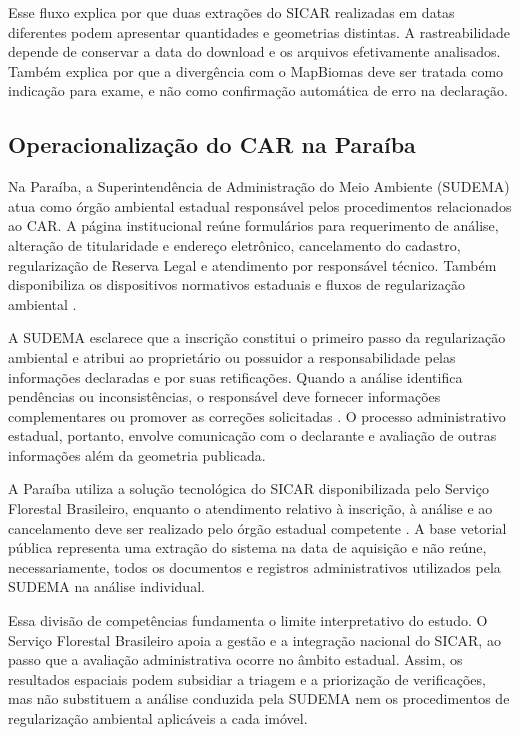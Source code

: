 Esse fluxo explica por que duas extrações do SICAR realizadas em datas diferentes podem apresentar quantidades e geometrias distintas. A rastreabilidade depende de conservar a data do download e os arquivos efetivamente analisados. Também explica por que a divergência com o MapBiomas deve ser tratada como indicação para exame, e não como confirmação automática de erro na declaração.

\subsection{Operacionalização do CAR na Paraíba}

Na Paraíba, a Superintendência de Administração do Meio Ambiente (SUDEMA) atua como órgão ambiental estadual responsável pelos procedimentos relacionados ao CAR. A página institucional reúne formulários para requerimento de análise, alteração de titularidade e endereço eletrônico, cancelamento do cadastro, regularização de Reserva Legal e atendimento por responsável técnico. Também disponibiliza os dispositivos normativos estaduais e fluxos de regularização ambiental \cite{sudema2026}.

A SUDEMA esclarece que a inscrição constitui o primeiro passo da regularização ambiental e atribui ao proprietário ou possuidor a responsabilidade pelas informações declaradas e por suas retificações. Quando a análise identifica pendências ou inconsistências, o responsável deve fornecer informações complementares ou promover as correções solicitadas \cite{sudema2026}. O processo administrativo estadual, portanto, envolve comunicação com o declarante e avaliação de outras informações além da geometria publicada.

A Paraíba utiliza a solução tecnológica do SICAR disponibilizada pelo Serviço Florestal Brasileiro, enquanto o atendimento relativo à inscrição, à análise e ao cancelamento deve ser realizado pelo órgão estadual competente \cite{brasilservicocar2025}. A base vetorial pública representa uma extração do sistema na data de aquisição e não reúne, necessariamente, todos os documentos e registros administrativos utilizados pela SUDEMA na análise individual.

Essa divisão de competências fundamenta o limite interpretativo do estudo. O Serviço Florestal Brasileiro apoia a gestão e a integração nacional do SICAR, ao passo que a avaliação administrativa ocorre no âmbito estadual. Assim, os resultados espaciais podem subsidiar a triagem e a priorização de verificações, mas não substituem a análise conduzida pela SUDEMA nem os procedimentos de regularização ambiental aplicáveis a cada imóvel.


